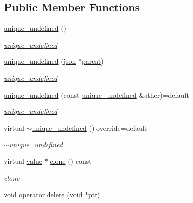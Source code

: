 \subsection*{Public Member Functions}
\begin{DoxyCompactItemize}
\item 
\hyperlink{classformat_1_1unique__undefined_afd232b15079ed7da34302cdea4a90677}{unique\+\_\+undefined} ()\hypertarget{classformat_1_1unique__undefined_afd232b15079ed7da34302cdea4a90677}{}\label{classformat_1_1unique__undefined_afd232b15079ed7da34302cdea4a90677}

\begin{DoxyCompactList}\small\item\em \hyperlink{classformat_1_1unique__undefined}{unique\+\_\+undefined} \end{DoxyCompactList}\item 
\hyperlink{classformat_1_1unique__undefined_afba0bc86b45598568a251d38f6a7b731}{unique\+\_\+undefined} (\hyperlink{classformat_1_1json}{json} $\ast$\hyperlink{classformat_1_1value_a86c03ec8810bfd0d60ec49095120040d}{parent})
\begin{DoxyCompactList}\small\item\em \hyperlink{classformat_1_1unique__undefined}{unique\+\_\+undefined} \end{DoxyCompactList}\item 
\hyperlink{classformat_1_1unique__undefined_a6d18209e8bb55eba57c378c84399ea3a}{unique\+\_\+undefined} (const \hyperlink{classformat_1_1unique__undefined}{unique\+\_\+undefined} \&other)=default
\begin{DoxyCompactList}\small\item\em \hyperlink{classformat_1_1unique__undefined}{unique\+\_\+undefined} \end{DoxyCompactList}\item 
virtual \hyperlink{classformat_1_1unique__undefined_a25e675a3f9fc1aab1d19a0f8a05920bf}{$\sim$unique\+\_\+undefined} () override=default\hypertarget{classformat_1_1unique__undefined_a25e675a3f9fc1aab1d19a0f8a05920bf}{}\label{classformat_1_1unique__undefined_a25e675a3f9fc1aab1d19a0f8a05920bf}

\begin{DoxyCompactList}\small\item\em $\sim$unique\+\_\+undefined \end{DoxyCompactList}\item 
virtual \hyperlink{classformat_1_1value_aa6b85823936bf7b8ab78d3f8d443c00d}{value} $\ast$ \hyperlink{classformat_1_1unique__undefined_af69057a00374c21c5cd73dc77efffb0e}{clone} () const 
\begin{DoxyCompactList}\small\item\em clone \end{DoxyCompactList}\item 
void \hyperlink{classformat_1_1unique__undefined_ae15b684d7cce6db1aa0cf71cf6be87c3}{operator delete} (void $\ast$ptr)\hypertarget{classformat_1_1unique__undefined_ae15b684d7cce6db1aa0cf71cf6be87c3}{}\label{classformat_1_1unique__undefined_ae15b684d7cce6db1aa0cf71cf6be87c3}


\end{DoxyCompactItemize}
